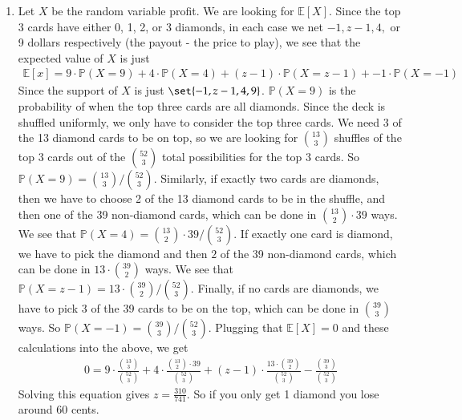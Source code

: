 \documentclass[12pt]{article}
\renewcommand{\P}{\mathbb{P}}
\theoremstyle{definition}
\theoremstyle{remark}
\newcommand{\E}{\mathbb{E}}
\begin{document}
\begin{enumerate}[leftmargin=\labelsep]
		\newpage
		\item Let $X$ be the random variable profit. We are looking for $\E[X]$. Since the top 3 cards have either 0, 1, 2, or 3 diamonds, in each case we net $-1, z-1, 4,$ or 9 dollars respectively (the payout - the price to play), we see that the expected value of $X$ is just
		\begin{align*}
			\E[x] = 9 \cdot \P(X=9) + 4 \cdot \P(X=4) + (z-1) \cdot \P(X=z-1) + -1 \cdot \P(X = -1)
		\end{align*}
		Since the support of $X$ is just $\set{-1, z-1, 4, 9}$. $\P(X=9)$ is the probability of when the top three cards are all diamonds. Since the deck is shuffled uniformly, we only have to consider the top three cards. We need 3 of the 13 diamond cards to be on top, so we are looking for ${13 \choose 3}$ shuffles of the top 3 cards  out of the ${52 \choose 3}$ total possibilities for the top 3 cards. So $\P(X=9) = {13 \choose 3}/ {52 \choose 3}$. Similarly, if exactly two cards are diamonds, then we have to choose 2 of the 13 diamond cards to be in the shuffle, and then one of the 39 non-diamond cards, which can be done in ${13 \choose 2} \cdot 39$ ways. We see that $\P(X=4) = {13 \choose 2} \cdot 39 / {52 \choose 3}$. If exactly one card is diamond, we have to pick the diamond and then $2$ of the 39 non-diamond cards, which can be done in $13 \cdot {39 \choose 2}$ ways. We see that $\P(X=z-1) = 13 \cdot {39 \choose 2} / {52 \choose 3}$. Finally, if no cards are diamonds, we have to pick 3 of the 39 cards to be on the top, which can be done in ${39 \choose 3}$ ways. So $\P(X=-1) = {39 \choose 3} / {52 \choose 3}$. Plugging that $\E[X] = 0$ and these calculations into the above, we get
		\begin{align*}
			0 = 9 \cdot \frac{{13 \choose 3}}{{52 \choose 3}}+ 4 \cdot \frac{{13 \choose 2} \cdot 39}{{52 \choose 3}} + (z-1) \cdot \frac{13 \cdot {39 \choose 2}}{{52 \choose 3}} - \frac{{39 \choose 3}}{{52 \choose 3}}
		\end{align*}
		Solving this equation gives $z = \frac{310}{741}$. So if you only get 1 diamond you lose around 60 cents.
		

\end{enumerate}
\end{document}
